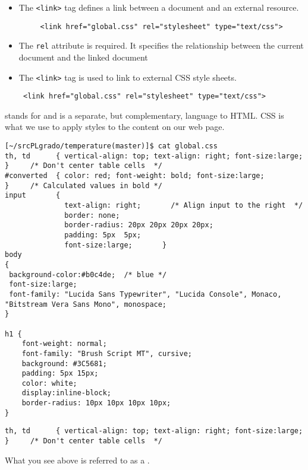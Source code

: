 \begin{itemize}
\item
The \verb|<link>| tag defines a link between a document and an external resource.
\begin{verbatim}
     <link href="global.css" rel="stylesheet" type="text/css">
\end{verbatim}
\item
The \verb|rel| attribute is required. It specifies the relationship between the current document and the linked document
\item
The \verb|<link>| tag is used to link to external CSS style sheets.
\begin{verbatim}
 <link href="global.css" rel="stylesheet" type="text/css">
\end{verbatim}
\end{itemize}


 stands for  and is a separate, but complementary, language to HTML. CSS is what we use to apply styles to the content on our web page.



    \begin{verbatim}
[~/srcPLgrado/temperature(master)]$ cat global.css 
th, td      { vertical-align: top; text-align: right; font-size:large; }     /* Don't center table cells  */
#converted  { color: red; font-weight: bold; font-size:large;          }     /* Calculated values in bold */
input       { 
              text-align: right;       /* Align input to the right  */
              border: none; 
              border-radius: 20px 20px 20px 20px;
              padding: 5px  5px;
              font-size:large;       }
body
{
 background-color:#b0c4de;  /* blue */
 font-size:large;
 font-family: "Lucida Sans Typewriter", "Lucida Console", Monaco, "Bitstream Vera Sans Mono", monospace;
}

h1 {
    font-weight: normal;
    font-family: "Brush Script MT", cursive;
    background: #3C5681;
    padding: 5px 15px;
    color: white;
    display:inline-block;
    border-radius: 10px 10px 10px 10px;
}
    \end{verbatim}
  

\begin{verbatim}
th, td      { vertical-align: top; text-align: right; font-size:large; }     /* Don't center table cells  */
\end{verbatim}
What you see above is referred to as a . 

